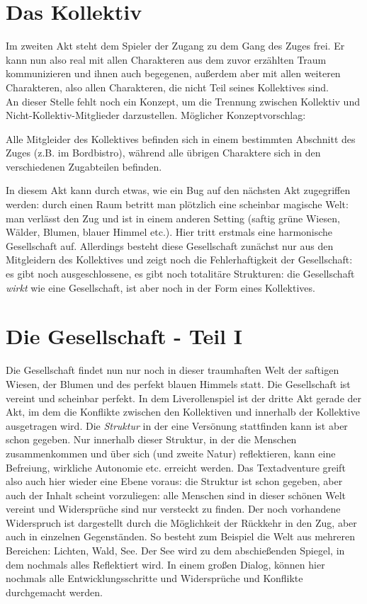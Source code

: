 \documentclass[12pt, a4paper, openany]{report}
\let\tempone\itemize
\let\temptwo\enditemize
\renewenvironment{itemize}{\tempone\addtolength{\itemsep}{-0.5\baselineskip}}{\temptwo}
\begin{document}
\section{Das Kollektiv} \label{das-kollektiv}
Im zweiten Akt steht dem Spieler der Zugang zu dem Gang des Zuges frei. 
Er kann nun also real mit allen Charakteren aus dem zuvor erzählten Traum kommunizieren und ihnen auch begegenen, außerdem aber mit allen weiteren Charakteren, also allen Charakteren, die nicht Teil seines Kollektives sind. \\
An dieser Stelle fehlt noch ein Konzept, um die Trennung zwischen Kollektiv und Nicht-Kollektiv-Mitglieder darzustellen.
Möglicher Konzeptvorschlag:
\begin{itemize}
\item[] Alle Mitgleider des Kollektives befinden sich in einem bestimmten Abschnitt des Zuges (z.B. im Bordbistro), während alle übrigen Charaktere sich in den verschiedenen Zugabteilen befinden.
\end{itemize}

In diesem Akt kann durch etwas, wie ein Bug auf den nächsten Akt zugegriffen werden: 
durch einen Raum betritt man plötzlich eine scheinbar magische Welt:
man verlässt den Zug und ist in einem anderen Setting (saftig grüne Wiesen, Wälder, Blumen, blauer Himmel etc.).
Hier tritt erstmals eine harmonische Gesellschaft auf. 
Allerdings besteht diese Gesellschaft zunächst nur aus den Mitgleidern des Kollektives und zeigt noch die Fehlerhaftigkeit der Gesellschaft: es gibt noch ausgeschlossene, es gibt noch totalitäre Strukturen: die Gesellschaft \textit{wirkt} wie eine Gesellschaft, ist aber noch in der Form eines Kollektives. 

\section{Die Gesellschaft - Teil I} \label{die-gesellschaft}
Die Gesellschaft findet nun nur noch in dieser traumhaften Welt der saftigen Wiesen, der Blumen und des perfekt blauen Himmels statt. 
Die Gesellschaft ist vereint und scheinbar perfekt. 
In dem Liverollenspiel ist der dritte Akt gerade der Akt, im dem die Konflikte zwischen den Kollektiven und innerhalb der Kollektive ausgetragen wird. 
Die \textit{Struktur} in der eine Versönung stattfinden kann ist aber schon gegeben. 
Nur innerhalb dieser Struktur, in der die Menschen zusammenkommen und über sich (und zweite Natur) reflektieren, kann eine Befreiung, wirkliche Autonomie etc. erreicht werden.
Das Textadventure greift also auch hier wieder eine Ebene voraus: die Struktur ist schon gegeben, aber auch der Inhalt scheint vorzuliegen: alle Menschen sind in dieser schönen Welt vereint und Widersprüche sind nur versteckt zu finden.
Der noch vorhandene Widerspruch ist dargestellt durch die Möglichkeit der Rückkehr in den Zug, aber auch in einzelnen Gegenständen.
So besteht zum Beispiel die Welt aus mehreren Bereichen: Lichten, Wald, See. 
Der See wird zu dem abschießenden Spiegel, in dem nochmals alles Reflektiert wird.
In einem großen Dialog, können hier nochmals alle Entwicklungsschritte und Widersprüche und Konflikte durchgemacht werden.
\end{document}
